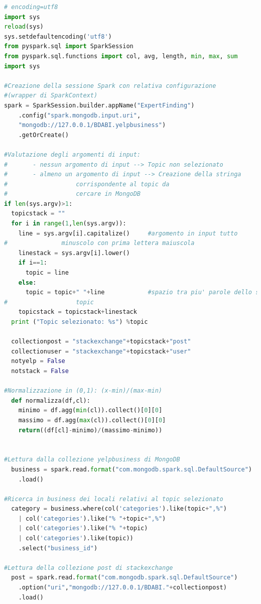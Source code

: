 \begin{lstlisting}[language=Python, caption={Expert Finding}, captionpos=b,label={lst:ef}]
# encoding=utf8
import sys
reload(sys)
sys.setdefaultencoding('utf8')
from pyspark.sql import SparkSession
from pyspark.sql.functions import col, avg, length, min, max, sum
import sys

#Creazione della sessione Spark con relativa configurazione 
#(wrapper di SparkContext)
spark = SparkSession.builder.appName("ExpertFinding")
	.config("spark.mongodb.input.uri", 
	"mongodb://127.0.0.1/BDABI.yelpbusiness")
	.getOrCreate()

#Valutazione degli argomenti di input:
#       - nessun argomento di input --> Topic non selezionato
#       - almeno un argomento di input --> Creazione della stringa 
#					corrispondente al topic da 
#					cercare in MongoDB
if len(sys.argv)>1:
  topicstack = ""
  for i in range(1,len(sys.argv)):
    line = sys.argv[i].capitalize()     #argomento in input tutto 
#				minuscolo con prima lettera maiuscola
    linestack = sys.argv[i].lower()
    if i==1:
      topic = line
    else:
      topic = topic+" "+line            #spazio tra piu' parole dello stesso 
#					topic
    topicstack = topicstack+linestack
  print ("Topic selezionato: %s") %topic

  collectionpost = "stackexchange"+topicstack+"post"
  collectionuser = "stackexchange"+topicstack+"user"
  notyelp = False
  notstack = False

#Normalizzazione in (0,1): (x-min)/(max-min)
  def normalizza(df,cl):
    minimo = df.agg(min(cl)).collect()[0][0]
    massimo = df.agg(max(cl)).collect()[0][0]
    return((df[cl]-minimo)/(massimo-minimo))


#Lettura dalla collezione yelpbusiness di MongoDB
  business = spark.read.format("com.mongodb.spark.sql.DefaultSource")
	.load()

#Ricerca in business dei locali relativi al topic selezionato
  category = business.where(col('categories').like(topic+",%") 
	| col('categories').like("% "+topic+",%") 
	| col('categories').like("% "+topic) 
	| col('categories').like(topic))
	.select("business_id")

#Lettura della collezione post di stackexchange
  post = spark.read.format("com.mongodb.spark.sql.DefaultSource")
	.option("uri","mongodb://127.0.0.1/BDABI."+collectionpost)
	.load()


\end{lstlisting}
